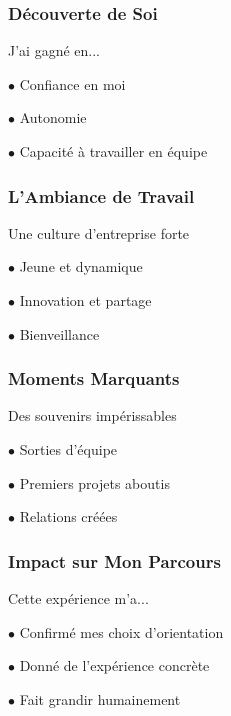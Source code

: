 \documentclass{beamer}
\begin{document}
\begin{frame}
\frametitle{Découverte de Soi}
\begin{center}
{\Large J'ai gagné en...}

\vspace{1cm}
$\bullet$ Confiance en moi

\vspace{0.5cm}
$\bullet$ Autonomie

\vspace{0.5cm}
$\bullet$ Capacité à travailler en équipe
\end{center}
\end{frame}

\begin{frame}
\frametitle{L'Ambiance de Travail}
\begin{center}
{\Large Une culture d'entreprise forte}

\vspace{1cm}
$\bullet$ Jeune et dynamique

\vspace{0.5cm}
$\bullet$ Innovation et partage

\vspace{0.5cm}
$\bullet$ Bienveillance
\end{center}
\end{frame}

\begin{frame}
\frametitle{Moments Marquants}
\begin{center}
{\Large Des souvenirs impérissables}

\vspace{1cm}
$\bullet$ Sorties d'équipe

\vspace{0.5cm}
$\bullet$ Premiers projets aboutis

\vspace{0.5cm}
$\bullet$ Relations créées
\end{center}
\end{frame}

\begin{frame}
\frametitle{Impact sur Mon Parcours}
\begin{center}
{\Large Cette expérience m'a...}

\vspace{1cm}
$\bullet$ Confirmé mes choix d'orientation

\vspace{0.5cm}
$\bullet$ Donné de l'expérience concrète

\vspace{0.5cm}
$\bullet$ Fait grandir humainement
\end{center}
\end{frame}
\end{document}

